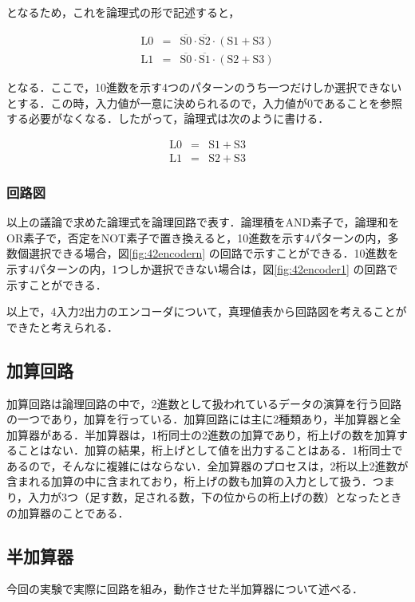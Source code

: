 となるため，これを論理式の形で記述すると，

\begin{eqnarray}
	\mathrm{L0} &=& \overline{\mathrm{S0}} \cdot \overline{\mathrm{S2}} \cdot (\mathrm{S1} + \mathrm{S3} ) \nonumber \\
	\mathrm{L1} &=& \overline{\mathrm{S0}} \cdot \overline{\mathrm{S1}} \cdot(\mathrm{S2} + \mathrm{S3} ) \nonumber 
\end{eqnarray}

となる．ここで，10進数を示す4つのパターンのうち一つだけしか選択できないとする．この時，入力値が一意に決められるので，入力値が0であることを参照する必要がなくなる．したがって，論理式は次のように書ける．

\begin{eqnarray}
	\mathrm{L0} &=& \mathrm{S1} + \mathrm{S3}  \nonumber \\
	\mathrm{L1} &=& \mathrm{S2} + \mathrm{S3} \nonumber 
\end{eqnarray}

%
%
\subsubsection{回路図}
以上の議論で求めた論理式を論理回路で表す．論理積をAND素子で，論理和をOR素子で，否定をNOT素子で置き換えると，10進数を示す4パターンの内，多数個選択できる場合，図\ref{fig:42encodern} の回路で示すことができる．10進数を示す4パターンの内，1つしか選択できない場合は，図\ref{fig:42encoder1} の回路で示すことができる．

以上で，4入力2出力のエンコーダについて，真理値表から回路図を考えることができたと考えられる．

%
% 
\subsection{加算回路}
\label{experiment_adder}
加算回路は論理回路の中で，2進数として扱われているデータの演算を行う回路の一つであり，加算を行っている．加算回路には主に2種類あり，半加算器と全加算器がある．半加算器は，1桁同士の2進数の加算であり，桁上げの数を加算することはない．加算の結果，桁上げとして値を出力することはある．1桁同士であるので，そんなに複雑にはならない．全加算器のプロセスは，2桁以上2進数が含まれる加算の中に含まれており，桁上げの数も加算の入力として扱う．つまり，入力が3つ（足す数，足される数，下の位からの桁上げの数）となったときの加算器のことである．

%
%
\subsection{半加算器}
\label{experiment_halfadder}
今回の実験で実際に回路を組み，動作させた半加算器について述べる．

